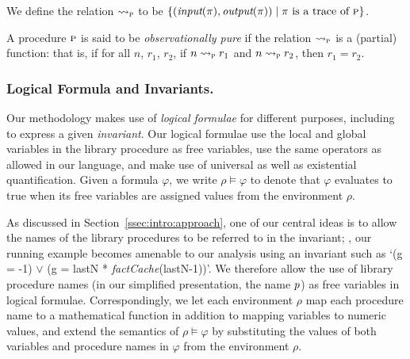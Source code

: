 

We define the relation $\rightsquigarrow_{\textsc{p}}$ to be $\{ (\textit{input}(\pi),\textit{output}(\pi)) \; | \; \pi \text{ is a trace of } \textsc{p} \}$.

\begin{definition}
\label{def:purity}
A procedure $\textsc{p}$ is said to be \emph{observationally pure} if the relation $\rightsquigarrow_{\textsc{p}}$ is a (partial) function:
that is, if for all $n$, $r_1$, $r_2$, if  $n \rightsquigarrow_{\textsc{p}} r_1$ and $n \rightsquigarrow_{\textsc{p}} r_2$, then $r_1 = r_2$.
\end{definition}

\subsubsection{Logical Formula and Invariants.}

Our methodology makes use of \emph{logical formulae} for different
purposes, including to express a given \emph{invariant}. 
Our logical formulae use the local and global variables in the library
procedure as free variables, use
the same operators as allowed in our language, and make use of universal as
well as existential quantification. 
Given a formula $\varphi$, 
we write $\rho \models \varphi$
to denote that $\varphi$ evaluates to true when its free variables are
assigned values from the environment $\rho$.

As discussed in Section~\ref{ssec:intro:approach},
one of our central ideas is to allow the names of the library procedures to
be referred to in the invariant; \eg, our running example becomes amenable
to our analysis using an invariant such as `(g = -1) $\vee$ (g = lastN *
\emph{factCache}(lastN-1))'.  We therefore allow the use of library
procedure names (in our simplified presentation, the name $p$) as free variables in
logical formulae. Correspondingly, 
we let each environment $\rho$ map each procedure name to a mathematical
function in addition to mapping variables to numeric values, and extend the
semantics of $\rho \models \varphi$ by substituting the values of both
variables and procedure names in $\varphi$ from the environment $\rho$. 



